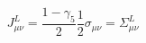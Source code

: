 \begin{equation} 
J_{\mu \nu}^{L} = \frac{1-\gamma_{5}}{2} \frac{1}{2} \sigma_{\mu \nu} = 
\Sigma_{\mu \nu}^{L}    
\end{equation} 
